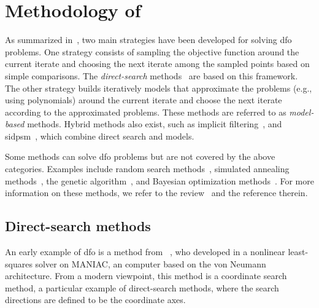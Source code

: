 \section{Methodology of }

As summarized in~\cite{Conn_Scheinberg_Vicente_2009b}, two main strategies have been developed for solving \gls{dfo} problems.
One strategy consists of sampling the objective function around the current iterate and choosing the next iterate among the sampled points based on simple comparisons.
The \emph{direct-search} methods~\cite{Kolda_Lewis_Torczon_2003} are based on this framework.
The other strategy builds iteratively models that approximate the problems (e.g., using polynomials) around the current iterate and choose the next iterate according to the approximated problems.
These methods are referred to as \emph{model-based} methods.
Hybrid methods also exist, such as implicit filtering~\cite{Kelley_2011}, and \gls{sidpsm}~\cite{Custodio_Rocha_Vicente_2009}, which combine direct search and models.

Some methods can solve \gls{dfo} problems but are not covered by the above categories.
Examples include random search methods~\cite{Zhigljavsky_1991}, simulated annealing methods~\cite{Kirkpatrick_Gelatt_Vecchi_1983}, the genetic algorithm~\cite{Jong_1975,Holland_1975}, and Bayesian optimization methods~\cite{Mockus_1975,Shahriari_Etal_2016}.
For more information on these methods, we refer to the review~\cite{Larson_Menickelly_Wild_2019} and the reference therein.

\subsection{Direct-search methods}

An early example of \gls{dfo} is a method from \citeauthor{Fermi_Metropolis_1952}~\cite{Fermi_Metropolis_1952}, who developed in \citeyear{Fermi_Metropolis_1952} a nonlinear least-squares solver on MANIAC, an computer based on the von Neumann architecture.
From a modern viewpoint, this method is a coordinate search method, a particular example of direct-search methods, where the search directions are defined to be the coordinate axes.

